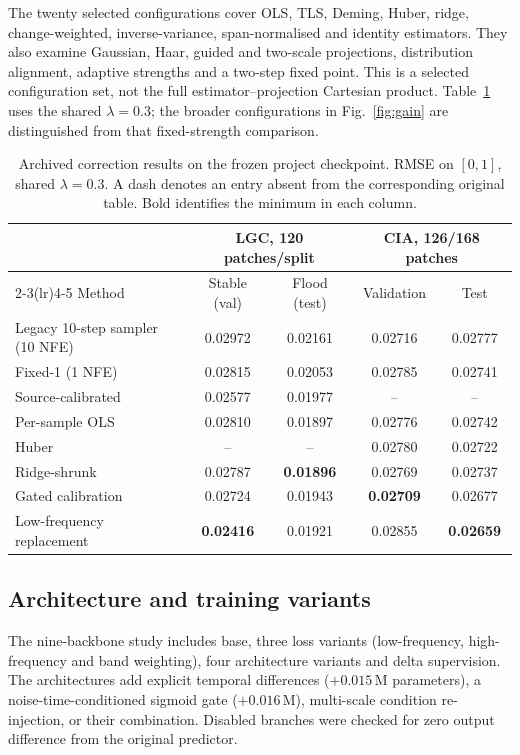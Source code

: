 \documentclass{article}
\begin{document}
The twenty selected configurations cover OLS, TLS, Deming, Huber, ridge, change-weighted, inverse-variance, span-normalised and identity estimators.
They also examine Gaussian, Haar, guided and two-scale projections, distribution alignment, adaptive strengths and a two-step fixed point.
This is a selected configuration set, not the full estimator--projection Cartesian product.
Table~\ref{tab:operators} uses the shared $\lambda=0.3$; the broader configurations in Fig.~\ref{fig:gain} are distinguished from that fixed-strength comparison.

\begin{table}[t]
\centering
\caption{Archived correction results on the frozen project checkpoint. RMSE on $[0,1]$, shared $\lambda=0.3$. A dash denotes an entry absent from the corresponding original table. Bold identifies the minimum in each column.}
\label{tab:operators}
\begin{tabular}{lcccc}
\toprule
 & \multicolumn{2}{c}{LGC, 120 patches/split} & \multicolumn{2}{c}{CIA, 126/168 patches}\\
\cmidrule(lr){2-3}\cmidrule(lr){4-5}
Method & Stable (val) & Flood (test) & Validation & Test\\
\midrule
Legacy 10-step sampler (10 NFE) & 0.02972 & 0.02161 & 0.02716 & 0.02777\\
Fixed-1 (1 NFE) & 0.02815 & 0.02053 & 0.02785 & 0.02741\\
Source-calibrated & 0.02577 & 0.01977 & -- & --\\
Per-sample OLS & 0.02810 & 0.01897 & 0.02776 & 0.02742\\
Huber & -- & -- & 0.02780 & 0.02722\\
Ridge-shrunk & 0.02787 & \textbf{0.01896} & 0.02769 & 0.02737\\
Gated calibration & 0.02724 & 0.01943 & \textbf{0.02709} & 0.02677\\
Low-frequency replacement & \textbf{0.02416} & 0.01921 & 0.02855 & \textbf{0.02659}\\
\bottomrule
\end{tabular}
\end{table}

\subsection{Architecture and training variants}
\label{sec:arch}
The nine-backbone study includes base, three loss variants (low-frequency, high-frequency and band weighting), four architecture variants and delta supervision.
The architectures add explicit temporal differences ($+0.015$\,M parameters), a noise-time-conditioned sigmoid gate ($+0.016$\,M), multi-scale condition re-injection, or their combination.
Disabled branches were checked for zero output difference from the original predictor.
\end{document}

